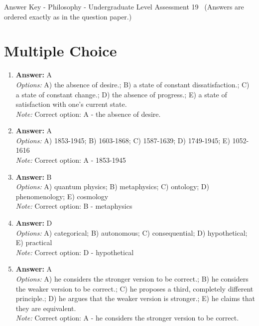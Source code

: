 \documentclass[12pt]{article}
\begin{document}
\begin{center}
Answer Key - Philosophy - Undergraduate Level Assessment 19 \
\small (Answers are ordered exactly as in the question paper.)
\end{center}

\section*{Multiple Choice}
\begin{enumerate}[label=\arabic*.]
\item \textbf{Answer:} A
\\ \textit{Options:} A) the absence of desire.; B) a state of constant dissatisfaction.; C) a state of constant change.; D) the absence of progress.; E) a state of satisfaction with one's current state.
\\ \textit{Note:} Correct option: A - the absence of desire.
\item \textbf{Answer:} A
\\ \textit{Options:} A) 1853-1945; B) 1603-1868; C) 1587-1639; D) 1749-1945; E) 1052-1616
\\ \textit{Note:} Correct option: A - 1853-1945
\item \textbf{Answer:} B
\\ \textit{Options:} A) quantum physics; B) metaphysics; C) ontology; D) phenomenology; E) cosmology
\\ \textit{Note:} Correct option: B - metaphysics
\item \textbf{Answer:} D
\\ \textit{Options:} A) categorical; B) autonomous; C) consequential; D) hypothetical; E) practical
\\ \textit{Note:} Correct option: D - hypothetical
\item \textbf{Answer:} A
\\ \textit{Options:} A) he considers the stronger version to be correct.; B) he considers the weaker version to be correct.; C) he proposes a third, completely different principle.; D) he argues that the weaker version is stronger.; E) he claims that they are equivalent.
\\ \textit{Note:} Correct option: A - he considers the stronger version to be correct.
\end{enumerate}
\end{document}
